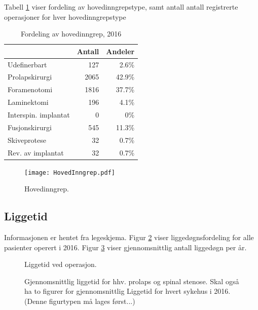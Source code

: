 \documentclass [norsk,a4paper,twoside]{article}\usepackage[]{graphicx}\usepackage[]{color}
\begin{document}
Tabell \ref{tab:AntHovedInngrep} viser fordeling av hovedinngrepstype, samt antall antall registrerte operasjoner for hver hovedinngrepstype

\begin{table}[ht]
\centering
\begin{tabular}{lrr}
  \hline
 & Antall & Andeler \\ 
  \hline
Udefinerbart & 127 & 2.6\% \\ 
  Prolapskirurgi & 2065 & 42.9\% \\ 
  Foramenotomi & 1816 & 37.7\% \\ 
  Laminektomi & 196 & 4.1\% \\ 
  Interspin. implantat & 0 & 0\% \\ 
  Fusjonskirurgi & 545 & 11.3\% \\ 
  Skiveprotese & 32 & 0.7\% \\ 
  Rev. av implantat & 32 & 0.7\% \\ 
   \hline
\end{tabular}
\caption{Fordeling av hovedinngrep, 2016} 
\label{tab:AntHovedInngrep}
\end{table}



\begin{figure}[ht]
	\centering \texttt{[image: HovedInngrep.pdf]}
	\caption{\label{fig:HovedInngrep} Hovedinngrep.}
\end{figure}




\subsection{Liggetid}

Informasjonen er hentet fra legeskjema.
Figur \ref{fig:Liggedogn} viser liggedøgnsfordeling for alle pasienter operert i 2016. Figur \ref{fig:LiggedognTid} viser gjennomsnittlig antall liggedøgn per år.  




\begin{figure}[h] 
\centerline{
  }
  \caption{Liggetid ved operasjon.}
  \label{fig:Liggedogn}
\end{figure}

\begin{figure}[h] 
\centerline{
  }
  \caption{Gjennomsnittlig liggetid for hhv. prolaps og spinal stenose. Skal også ha to figurer for gjennomsnittlig Liggetid for hvert sykehus i 2016. (Denne figurtypen må lages først...)}
  \label{fig:LiggedognTid}
\end{figure}
\end{document}
